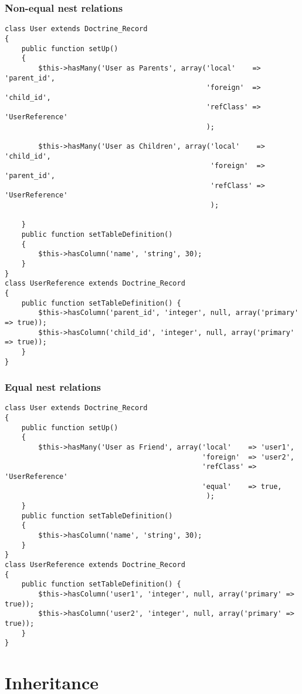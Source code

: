 \documentclass[11pt,a4paper]{report}
\begin{document}
\subsubsection{Non-equal nest relations}
\begin{verbatim}
class User extends Doctrine_Record
{
    public function setUp()
    {
        $this->hasMany('User as Parents', array('local'    => 'parent_id',
                                                'foreign'  => 'child_id',
                                                'refClass' => 'UserReference'
                                                );

        $this->hasMany('User as Children', array('local'    => 'child_id',
                                                 'foreign'  => 'parent_id',
                                                 'refClass' => 'UserReference'
                                                 );

    }
    public function setTableDefinition()
    {
        $this->hasColumn('name', 'string', 30);
    }
}
class UserReference extends Doctrine_Record
{
    public function setTableDefinition() {
        $this->hasColumn('parent_id', 'integer', null, array('primary' => true));
        $this->hasColumn('child_id', 'integer', null, array('primary' => true));
    }
}
\end{verbatim}

\subsubsection{Equal nest relations}
\begin{verbatim}
class User extends Doctrine_Record
{
    public function setUp()
    {
        $this->hasMany('User as Friend', array('local'    => 'user1',
                                               'foreign'  => 'user2',
                                               'refClass' => 'UserReference'
                                               'equal'    => true,
                                                );
    }
    public function setTableDefinition()
    {
        $this->hasColumn('name', 'string', 30);
    }
}
class UserReference extends Doctrine_Record
{
    public function setTableDefinition() {
        $this->hasColumn('user1', 'integer', null, array('primary' => true));
        $this->hasColumn('user2', 'integer', null, array('primary' => true));
    }
}
\end{verbatim}

\section{Inheritance}
\end{document}
